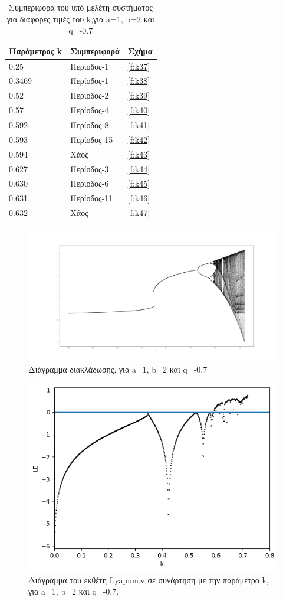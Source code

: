 \begin{table}[h!]
	\centering
	\begin{tabular}{l | l | l}
		Παράμετρος k & Συμπεριφορά & Σχήμα\\
		\hline
		0.25 &  Περίοδος-1 & \ref{f:k37}\\
		0.3469&  Περίοδος-1 & \ref{f:k38}\\
		0.52& Περίοδος-2 & \ref{f:k39}\\
		0.57& Περίοδος-4 & \ref{f:k40}\\
		0.592 &  Περίοδος-8 & \ref{f:k41}\\
		0.593& Περίοδος-15 & \ref{f:k42}\\
		0.594 & Χάος & \ref{f:k43}\\
		0.627 & Περίοδος-3 & \ref{f:k44}\\
		0.630 & Περίοδος-6 & \ref{f:k45}\\
		0.631 & Περίοδος-11 & \ref{f:k46}\\
		0.632 & Χάος & \ref{f:k47}\\
	\end{tabular}
	\caption{ Συμπεριφορά του υπό μελέτη συστήματος για διάφορες τιμές του k,για a=1, b=2 και q=-0.7}
	\label{tab:abc3}
\end{table}

\begin{figure}[h!]
	\centering
	\includegraphics[width=0.8\linewidth]{LateX images/graphs q07/g1}
	\caption{ Διάγραμμα διακλάδωσης, για a=1, b=2 και q=-0.7}
	\label{f:g12}
\end{figure}
\begin{figure}[h!]
	\centering
	\includegraphics[width=0.6\linewidth]{"LateX images/graphs q07/g2 "}
	\caption{Διάγραμμα του εκθέτη Lyapunov σε συνάρτηση με την παράμετρο k, για a=1, b=2 και q=-0.7.}
	\label{f:g13}
\end{figure}

